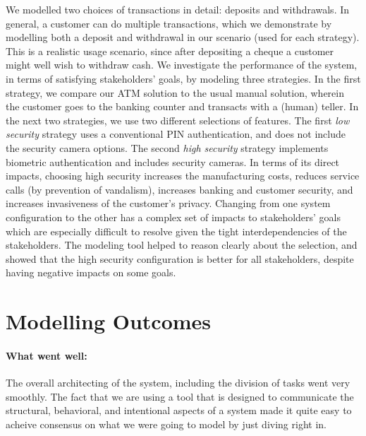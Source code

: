 \documentclass[10pt,fleqn]{article}
\begin{document}
We modelled two choices of transactions in
detail: deposits and withdrawals.  In general, a customer can do multiple 
transactions, which we demonstrate by modelling both a deposit and withdrawal
in our scenario (used for each strategy). This is a realistic usage scenario,
since after depositing a cheque a customer might well wish to withdraw
cash. We investigate the performance of the system, in terms of satisfying
stakeholders' goals, by modeling three strategies.  In the first strategy,
we compare our ATM solution to the usual manual solution, wherein the customer
goes to the banking counter and transacts with a (human) teller. In the 
next two strategies, we use two different selections of features. The first
\textit{low security} strategy uses a conventional PIN authentication,
and does not include the security camera options.  The second 
\textit{high security} strategy implements biometric authentication and 
includes security cameras.  In terms of its direct impacts, choosing high 
security increases the manufacturing costs, reduces service calls (by 
prevention of vandalism), increases banking and customer security, and 
increases invasiveness of the customer's privacy.  Changing from one system
configuration to the other
has a complex set of impacts to stakeholders' goals which are especially 
difficult to resolve given the tight interdependencies of the stakeholders.
The modeling tool helped to reason clearly about the selection, and showed that
the high security configuration is better for all stakeholders, despite
having negative impacts on some goals.

\section{Modelling Outcomes}
\paragraph{What went well:}
	The overall architecting of the system, including the division of tasks
	went very smoothly.  The fact that we are using a tool that is
	designed to communicate the structural, behavioral, and intentional 
	aspects of a system made it quite easy to acheive consensus on what we
	were going to model by just diving right in.
\end{document}
